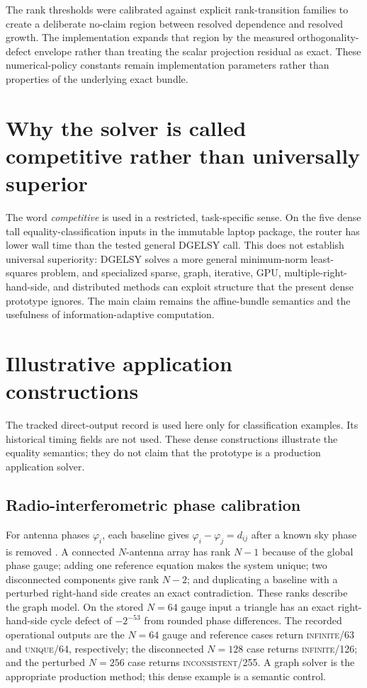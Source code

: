 \documentclass[11pt]{article}
\theoremstyle{definition}
\begin{document}
The rank thresholds were calibrated against explicit rank-transition families to create a deliberate no-claim region between resolved dependence and resolved growth. The implementation expands that region by the measured orthogonality-defect envelope rather than treating the scalar projection residual as exact. These numerical-policy constants remain implementation parameters rather than properties of the underlying exact bundle.

\section{Why the solver is called competitive rather than universally superior}\label{app:competitive}
The word \emph{competitive} is used in a restricted, task-specific sense. On the five dense tall equality-classification inputs in the immutable laptop package, the router has lower wall time than the tested general DGELSY call. This does not establish universal superiority: DGELSY solves a more general minimum-norm least-squares problem, and specialized sparse, graph, iterative, GPU, multiple-right-hand-side, and distributed methods can exploit structure that the present dense prototype ignores. The main claim remains the affine-bundle semantics and the usefulness of information-adaptive computation.

\section{Illustrative application constructions}\label{app:astro}
The tracked direct-output record  is used
here only for classification examples. Its historical timing fields are not
used. These dense constructions illustrate the equality semantics; they do
not claim that the prototype is a production application solver.

\subsection{Radio-interferometric phase calibration}
For antenna phases $\varphi_i$, each baseline gives
$\varphi_i-\varphi_j=d_{ij}$ after a known sky phase is removed
\citep{finlay2023tabascal}. A connected $N$-antenna array has rank $N-1$
because of the global phase gauge; adding one reference equation makes the
system unique; two disconnected components give rank $N-2$; and duplicating a
baseline with a perturbed right-hand side creates an exact contradiction. These ranks describe the graph model. On the stored $N=64$ gauge input a triangle has an exact right-hand-side cycle defect of $-2^{-53}$ from rounded phase differences. The recorded operational outputs are the $N=64$ gauge and
reference cases return \textsc{infinite}/63 and \textsc{unique}/64,
respectively; the disconnected $N=128$ case returns \textsc{infinite}/126;
and the perturbed $N=256$ case returns \textsc{inconsistent}/255. A graph
solver is the appropriate production method; this dense example is a semantic
control.
\end{document}
